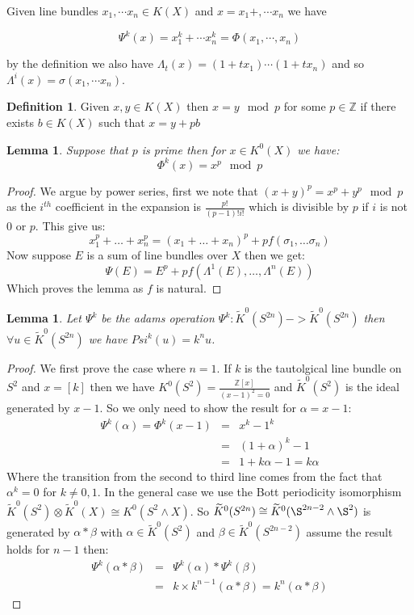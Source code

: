 \documentclass[a4paper,10pt]{article}
\theoremstyle{plain}%
\newtheorem{lem}[thm]{Lemma}
\theoremstyle{definition}
\newtheorem{defn}{Definition}
\theoremstyle{remark}
\newcommand{\ZZ}{\mathbb{Z}}
\newcommand{\KR}{\widetilde{K}}   %
\newcommand{\smsh}{\wedge}  %
\begin{document}
Given line bundles $x_1,\cdots x_n\in K(X)$ and $x=x_1+,\cdots x_n$ we have

$$\Psi^k(x)=x_1^k+\cdots x_n^k = \Phi(x_1,\cdots ,x_n)$$

by the definition we also have $\Lambda_t(x)=(1+t x_1)\cdots (1+t x_n)$ and so
$\Lambda^i(x)=\sigma(x_1,\cdots x_n)$.

\begin{defn}
  Given $x,y\in K(X)$ then $x=y \mod p$ for some $p\in \ZZ$ if there exists
  $b\in K(X)$ such that $x=y+p b$
\end{defn}

\begin{lem}
  Suppose that $p$ is prime then for $x\in K^0(X)$ we have:
$$\Phi^k(x)=x^p \mod p$$
\end{lem}

\begin{proof}
  We argue by power series, first we note that $(x+y)^p=x^p+y^p \mod p$ as the 
  $i^{th}$ coefficient in the expansion is $\frac{p!}{(p-1)!i!}$ which is
  divisible by $p$ if $i$ is not 0 or $p$. This give us:
$$x_1^p + \ldots + x_n^p=(x_1+\ldots+x_n)^p + p f(\sigma_1,\ldots \sigma_n)$$
Now suppose $E$ is a sum of line bundles over $X$ then we get:
$$\Psi(E)=E^p+p f(\Lambda^1(E),\ldots,\Lambda^n(E))$$
Which proves the lemma as $f$ is natural.
\end{proof}

\begin{lem}
Let $\Psi^k$ be the adams operation $\Psi^k:\KR^0(S^{2n})->\KR^0(S^{2n})$ then
$\forall u\in \KR^0(S^{2n})$ we have $Psi^k(u)=k^nu$. 
\end{lem}

\begin{proof}
  We first prove the case where $n=1$. If $k$ is the tautolgical line
  bundle on $S^2$ and $x=[k]$ then we have $K^0(S^2)=\frac{\ZZ[x]}{(x-1)^2=0}$
  and $\KR^0(S^2)$ is the ideal generated by $x-1$. So we only need to show
  the result for $\alpha=x-1$:
\begin{align*}
  \Psi^k(\alpha)=\Phi^k(x-1)&=&x^k-1^k\\
  &=& (1+\alpha)^k - 1\\
  &=& 1+k\alpha-1 = k\alpha
\end{align*}
Where the transition from the second to third line comes from the fact that
$\alpha^k=0$ for $k\neq 0,1$. In the general case we use the Bott periodicity isomorphism
$\KR^0(S^2)\otimes\KR^0(X)\cong K^0(S^2\smsh X)$. So
$\KR^0(S^{2n})\cong\KR^0(\S^{2n-2}\smsh\S^2)$ is generated by
$\alpha\ast\beta$ with $\alpha\in\KR^0(S^2)$ and $\beta\in\KR^0(S^{2n-2})$
assume the result holds for $n-1$ then:
\begin{align*}
  \Psi^k(\alpha\ast\beta)&=&\Psi^k(\alpha)\ast\Psi^k(\beta)\\
  &=&k\times k^{n-1}(\alpha\ast\beta) = k^n(\alpha\ast\beta)
\end{align*}
\end{proof}
\end{document}
